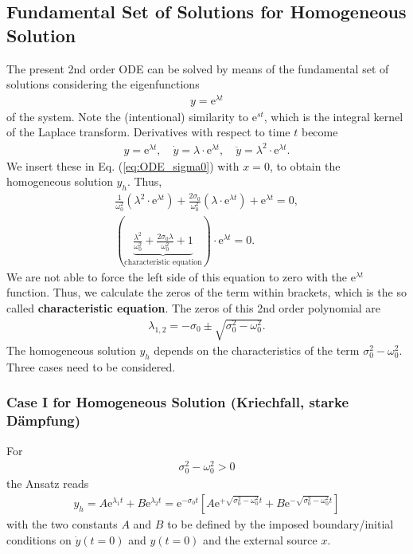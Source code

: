 \documentclass[a4paper,11pt,oneside]{scrartcl}
\newcommand{\eq}[1]{Eq. (\ref{#1})}
\begin{document}
\subsection{Fundamental Set of Solutions for Homogeneous Solution}
\label{Sec:FundamentalSet}
The present 2nd order ODE can be solved by means of the
fundamental set of solutions
considering the eigenfunctions
\begin{align}
y = \mathrm{e}^{\lambda t}
\end{align}
of the system. Note the (intentional) similarity to $\mathrm{e}^{s t}$,
which is the integral kernel of the Laplace transform.
%
Derivatives with respect to time $t$ become
\begin{align}
y = \mathrm{e}^{\lambda t},\quad
\dot{y} = \lambda \cdot \mathrm{e}^{\lambda t},\quad
\ddot{y} = \lambda^2 \cdot \mathrm{e}^{\lambda t}.
\end{align}
%
We insert these in \eq{eq:ODE_sigma0} with $x=0$, to obtain the
homogeneous solution $y_h$. Thus,
\begin{align}
\frac{1}{\omega_0^2} (\lambda^2 \cdot \mathrm{e}^{\lambda t}) +
\frac{2 \sigma_0}{\omega_0^2} (\lambda \cdot \mathrm{e}^{\lambda t}) +
\mathrm{e}^{\lambda t} = 0,\nonumber\\
\label{eq:CharEq}
(\underbrace{\frac{\lambda^2}{\omega_0^2} +
\frac{2 \sigma_0 \lambda}{\omega_0^2} + 1}_\text{characteristic equation})
\cdot \mathrm{e}^{\lambda t} = 0.
\end{align}
%
We are not able to force the left side of this equation to zero with the $\mathrm{e}^{\lambda t}$
function.
Thus, we calculate the zeros of the term within brackets, which is the so
called \textbf{characteristic equation}.
The zeros of this 2nd order polynomial are
\begin{align}
\label{lambda12}
\lambda_{1,2} = -\sigma_0 \pm \sqrt{\sigma_0^2 - \omega_0^2}.
\end{align}
%
The homogeneous solution $y_h$ depends on the characteristics
of the term $\sigma_0^2 - \omega_0^2$.
Three cases need to be considered.

\subsubsection{Case I for Homogeneous Solution (Kriechfall, starke Dämpfung)}
For
\begin{align}
\sigma_0^2 - \omega_0^2 > 0
\end{align}
the Ansatz reads
\begin{align}
y_h=
A \mathrm{e}^{\lambda_1 t} + B \mathrm{e}^{\lambda_2 t}
=
\mathrm{e}^{-\sigma_0 t} [A \mathrm{e}^{+\sqrt{\sigma_0^2 - \omega_0^2} t}
+ B \mathrm{e}^{-\sqrt{\sigma_0^2 - \omega_0^2} t}]
\end{align}
with the two constants $A$ and $B$ to be defined by the imposed
boundary/initial conditions on $\dot{y}(t=0)$ and $y(t=0)$ and the
external source $x$.
\end{document}
